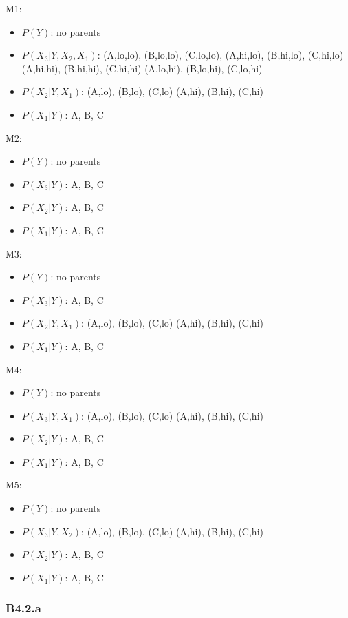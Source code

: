 \documentclass{article}
\begin{document}
M1: \begin{itemize}
    \item $P(Y)$: no parents
    \item $P(X_3|Y,X_2,X_1)$: 
    (A,lo,lo), (B,lo,lo), (C,lo,lo), 
    (A,hi,lo), (B,hi,lo), (C,hi,lo)
    (A,hi,hi), (B,hi,hi), (C,hi,hi)
    (A,lo,hi), (B,lo,hi), (C,lo,hi)
    \item $P(X_2|Y,X_1)$: 
    (A,lo), (B,lo), (C,lo)
    (A,hi), (B,hi), (C,hi)
    \item $P(X_1|Y)$:
    A, B, C
\end{itemize}
M2: \begin{itemize}
    \item $P(Y)$: no parents
    \item $P(X_3|Y)$: A, B, C
    \item $P(X_2|Y)$: A, B, C
    \item $P(X_1|Y)$: A, B, C
\end{itemize}
M3: \begin{itemize}
    \item $P(Y)$: no parents
    \item $P(X_3|Y)$: A, B, C
    \item $P(X_2|Y,X_1)$:
    (A,lo), (B,lo), (C,lo)
    (A,hi), (B,hi), (C,hi)
    \item $P(X_1|Y)$: A, B, C
\end{itemize}
M4: \begin{itemize}
    \item $P(Y)$: no parents
    \item $P(X_3|Y,X_1)$: 
    (A,lo), (B,lo), (C,lo)
    (A,hi), (B,hi), (C,hi)
    \item $P(X_2|Y)$: A, B, C
    \item $P(X_1|Y)$: A, B, C
\end{itemize}
M5: \begin{itemize}
    \item $P(Y)$: no parents
    \item $P(X_3|Y,X_2)$: 
    (A,lo), (B,lo), (C,lo)
    (A,hi), (B,hi), (C,hi)
    \item $P(X_2|Y)$: A, B, C
    \item $P(X_1|Y)$: A, B, C
\end{itemize}

\subsubsection*{B4.2.a}
\label{sec:B:B4:2.a}
\end{document}

